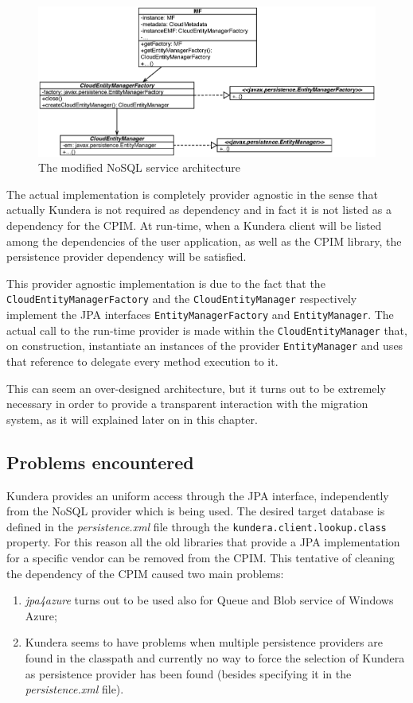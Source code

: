 \begin{figure}[tbh]
  \centering
  \includegraphics[width=14cm]{images/cpim_nosql_kundera}
  \caption{The modified NoSQL service architecture}
  \label{fig:cpim-kundera}
\end{figure}

\noindent The actual implementation is completely provider agnostic in the sense that actually Kundera is not required as dependency and in fact it is not listed as a dependency for the CPIM. At run-time, when a Kundera client will be listed among the dependencies of the user application, as well as the CPIM library, the persistence provider dependency will be satisfied.

\noindent This provider agnostic implementation is due to the fact that the \texttt{CloudEntityManagerFactory} and the \texttt{CloudEntityManager} respectively implement the JPA interfaces \texttt{EntityManagerFactory}  and \texttt{EntityManager}.
The actual call to the run-time provider is made within the \texttt{CloudEntityManager} that, on construction, instantiate an instances of the provider \texttt{EntityManager} and uses that reference to delegate every method execution to it.

\noindent This can seem an over-designed architecture, but it turns out to be extremely necessary in order to provide a transparent interaction with the migration system, as it will explained later on in this chapter.

\subsection{Problems encountered}
\label{sec:cpim-problems}
Kundera provides an uniform access through the JPA interface, independently from the NoSQL provider which is being used. The desired target database is defined in the \textit{persistence.xml} file through the \texttt{kundera.client.lookup.class} property. For this reason all the old libraries that provide a JPA implementation for a specific vendor can be removed from the CPIM. 
This tentative of cleaning the dependency of the CPIM caused two main problems:
\begin{enumerate}
\item \textit{jpa4azure} turns out to be used also for Queue and Blob service of Windows Azure;
\item Kundera seems to have problems when multiple persistence providers are found in the classpath and currently no way to force the selection of Kundera as persistence provider has been found (besides specifying it in the \textit{persistence.xml} file).
\end{enumerate} 

